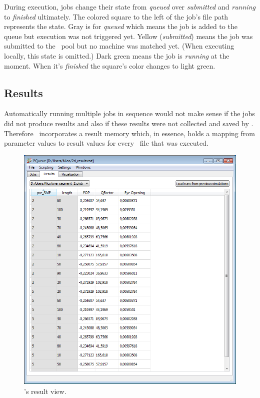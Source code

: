 During execution, jobs change their state from \textit{queued} over \textit{submitted} and \textit{running}
to \textit{finished} ultimately.
The colored square to the left of the job's file path represents the state.
Gray is for \textit{queued} which means the job is added to the queue but execution was not triggered yet.
Yellow (\textit{submitted}) means the job was submitted to the \Condor\ pool
but no machine was matched yet.
(When executing locally, this state is omitted.)
Dark green means the job is \textit{running} at the moment.
When it's \textit{finished} the square's color changes to light green.





\subsection{Results}
\label{pqueue:results}

Automatically running multiple jobs in sequence
would not make sense if the jobs did not produce results
and also if these results were not collected and saved by \PQUEUE.
Therefore \PQUEUE\ incorporates a result memory
which, in essence, holds a mapping from parameter values to result values
for every \PJOB\ file that was executed.

\begin{figure}[!ht]
\includegraphics[width=\textwidth]{Screenshots/PQueue/results.png}
\caption{\PQUEUE's result view.}
\label{pqueue:results}
\end{figure}


